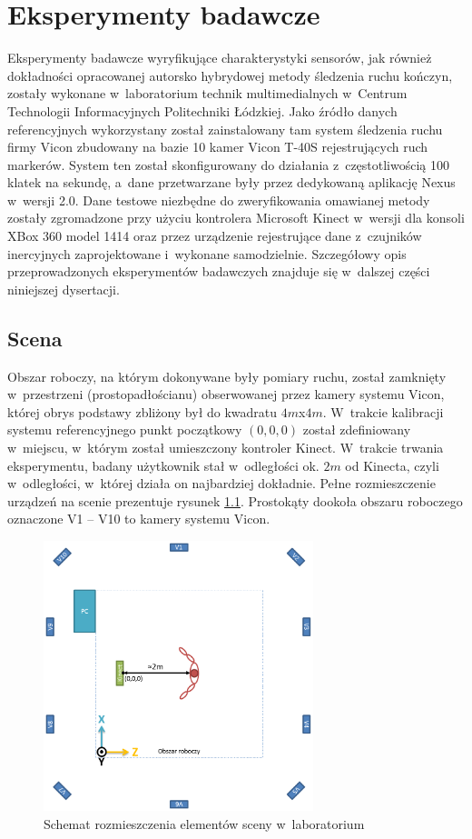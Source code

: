 \chapter{Eksperymenty badawcze}\label{chap:experiments}
Eksperymenty badawcze wyryfikujące charakterystyki sensorów, jak również dokładności opracowanej autorsko hybrydowej metody śledzenia ruchu kończyn, zostały wykonane w~laboratorium technik multimedialnych w~Centrum Technologii Informacyjnych Politechniki Łódzkiej. Jako źródło danych referencyjnych wykorzystany został zainstalowany tam system śledzenia ruchu firmy Vicon zbudowany na bazie 10 kamer Vicon T-40S  rejestrujących ruch markerów. System ten został skonfigurowany do działania z~częstotliwością 100 klatek na sekundę, a~dane przetwarzane były przez dedykowaną aplikację Nexus w~wersji 2.0. Dane testowe niezbędne do zweryfikowania omawianej metody zostały zgromadzone przy użyciu kontrolera Microsoft Kinect w~wersji dla konsoli XBox 360 model 1414 oraz przez urządzenie rejestrujące dane z~czujników inercyjnych zaprojektowane i~wykonane samodzielnie. Szczegółowy opis przeprowadzonych eksperymentów badawczych znajduje się w~dalszej części niniejszej dysertacji.

\section{Scena}
Obszar roboczy, na którym dokonywane były pomiary ruchu, został zamknięty w~przestrzeni (prostopadłościanu) obserwowanej przez kamery systemu Vicon, której obrys podstawy zbliżony był do kwadratu $4m$x$4m$. W~trakcie kalibracji systemu referencyjnego punkt początkowy $\left(0, 0, 0\right)$ został zdefiniowany w~miejscu, w~którym został umieszczony kontroler Kinect. W~trakcie trwania eksperymentu, badany użytkownik stał w~odległości ok. $2m$ od Kinecta, czyli w~odległości, w~której działa on najbardziej dokładnie.  Pełne rozmieszczenie urządzeń na scenie prezentuje rysunek \ref{fig:experiments:scene}. Prostokąty dookoła obszaru roboczego oznaczone V1 -- V10 to kamery systemu Vicon.

\begin{figure}[!htp]
	\centering
	\includegraphics[width=0.7\textwidth]{images/scene.png}
	\caption{Schemat rozmieszczenia elementów sceny w~laboratorium}
	\label{fig:experiments:scene}
\end{figure}
  
